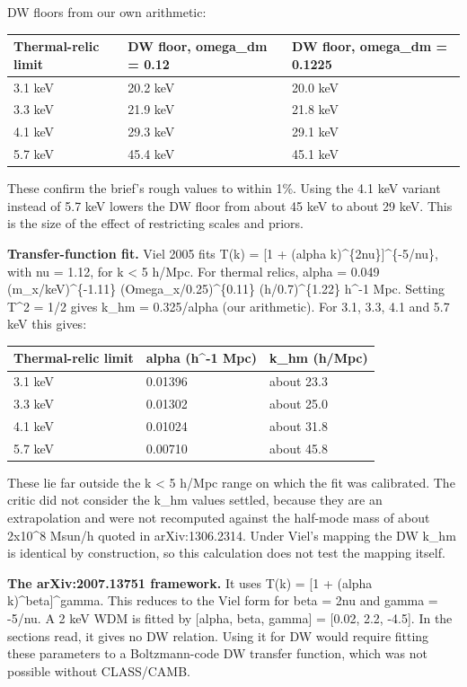 \documentclass[11pt,a4paper]{article}
\begin{document}
DW floors from our own arithmetic:

\begin{longtable}{@{}p{}p{}p{}@{}}
\toprule
\textbf{Thermal-relic limit} & \textbf{DW floor, omega\_dm = 0.12} & \textbf{DW floor, omega\_dm = 0.1225} \\ \midrule \endhead
3.1 keV & 20.2 keV & 20.0 keV \\
3.3 keV & 21.9 keV & 21.8 keV \\
4.1 keV & 29.3 keV & 29.1 keV \\
5.7 keV & 45.4 keV & 45.1 keV \\
\bottomrule\end{longtable}
These confirm the brief's rough values to within 1\%. Using the 4.1 keV variant instead of 5.7 keV lowers the DW floor from about 45 keV to about 29 keV. This is the size of the effect of restricting scales and priors.

\textbf{Transfer-function fit.} Viel 2005 fits T(k) = [1 + (alpha k)\textasciicircum{}\{2nu\}]\textasciicircum{}\{-5/nu\}, with nu = 1.12, for k \textless{} 5 h/Mpc. For thermal relics, alpha = 0.049 (m\_x/keV)\textasciicircum{}\{-1.11\} (Omega\_x/0.25)\textasciicircum{}\{0.11\} (h/0.7)\textasciicircum{}\{1.22\} h\textasciicircum{}-1 Mpc. Setting T\textasciicircum{}2 = 1/2 gives k\_hm = 0.325/alpha (our arithmetic). For 3.1, 3.3, 4.1 and 5.7 keV this gives:

\begin{longtable}{@{}p{}p{}p{}@{}}
\toprule
\textbf{Thermal-relic limit} & \textbf{alpha (h\textasciicircum{}-1 Mpc)} & \textbf{k\_hm (h/Mpc)} \\ \midrule \endhead
3.1 keV & 0.01396 & about 23.3 \\
3.3 keV & 0.01302 & about 25.0 \\
4.1 keV & 0.01024 & about 31.8 \\
5.7 keV & 0.00710 & about 45.8 \\
\bottomrule\end{longtable}
These lie far outside the k \textless{} 5 h/Mpc range on which the fit was calibrated. The critic did not consider the k\_hm values settled, because they are an extrapolation and were not recomputed against the half-mode mass of about 2x10\textasciicircum{}8 Msun/h quoted in arXiv:1306.2314. Under Viel's mapping the DW k\_hm is identical by construction, so this calculation does not test the mapping itself.

\textbf{The arXiv:2007.13751 framework.} It uses T(k) = [1 + (alpha k)\textasciicircum{}beta]\textasciicircum{}gamma. This reduces to the Viel form for beta = 2nu and gamma = -5/nu. A 2 keV WDM is fitted by [alpha, beta, gamma] = [0.02, 2.2, -4.5]. In the sections read, it gives no DW relation. Using it for DW would require fitting these parameters to a Boltzmann-code DW transfer function, which was not possible without CLASS/CAMB.
\end{document}
